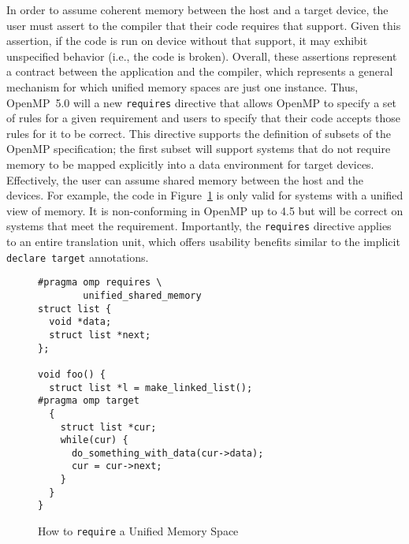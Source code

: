 In order to assume coherent memory between the host and a target device, 
the user must assert to the compiler that their code requires that support.
Given this assertion, if the code is run on device without that support, 
it may exhibit unspecified behavior (i.e., the code is broken). Overall,
these assertions represent a contract between the application and the 
compiler, which represents a general mechanism for which unified memory
spaces are just one instance. Thus, OpenMP~5.0 will a new \texttt{requires} 
directive that allows OpenMP to specify a set of rules for a given 
requirement and users to specify that their code accepts those rules for
it to be correct. This directive supports the definition of subsets of 
the OpenMP specification; the first subset will support systems that do 
not require memory to be mapped explicitly into a data environment for 
target devices. Effectively, the user can assume shared memory between
the host and the devices. For example, the code in Figure~\ref{fig:unified} 
is only valid for systems with a unified view of memory. It is non-conforming 
in OpenMP up to 4.5 but will be correct on systems that meet the requirement.
Importantly, the \texttt{requires} directive applies to an entire translation
unit, which offers usability benefits similar to the implicit 
\texttt{declare target} annotations.

\begin{figure}
\begin{verbatim}
#pragma omp requires \
        unified_shared_memory
struct list {
  void *data;
  struct list *next;
};

void foo() {
  struct list *l = make_linked_list();
#pragma omp target
  {
    struct list *cur;
    while(cur) {
      do_something_with_data(cur->data);
      cur = cur->next;
    }
  }
}
\end{verbatim}
\caption{How to \texttt{require} a Unified Memory Space}
\label{fig:unified}
\end{figure}

